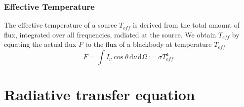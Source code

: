 \subsubsection*{Effective Temperature}

The effective temperature of a source $T_{eff}$ is derived from the total amount of flux, integrated over all frequencies, radiated at the source. We obtain $T_{eff}$ by equating the actual flux $F$ to the flux of a blackbody at temperature $T_{eff}$
\begin{equation}
    F = \int I_{\nu}\cos\theta \,\text{d}\nu\,\text{d}\Omega := \sigma T_{eff}^{4}
    \label{eq:effectivetemperature} 
\end{equation}

\section{Radiative transfer equation}


